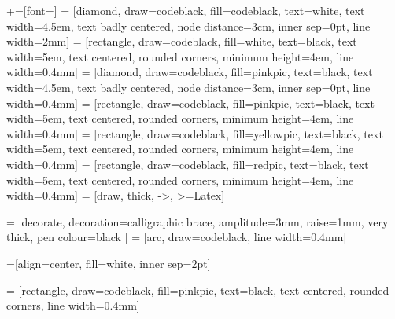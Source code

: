 +=[font=\footnotesize\sffamily]
\usetikzlibrary{calc, shapes, arrows, decorations.pathreplacing, calligraphy,
                positioning, arrows.meta}
 = [diamond, draw=codeblack, fill=codeblack, text=white,
    text width=4.5em, text badly centered, node distance=3cm, inner sep=0pt,
    line width=2mm]
 = [rectangle, draw=codeblack, fill=white,  text=black,
    text width=5em, text centered, rounded corners, minimum height=4em,
    line width=0.4mm]
 = [diamond, draw=codeblack, fill=pinkpic, text=black,
    text width=4.5em, text badly centered, node distance=3cm, inner sep=0pt,
    line width=0.4mm]
 = [rectangle, draw=codeblack, fill=pinkpic,  text=black,
    text width=5em, text centered, rounded corners, minimum height=4em,
    line width=0.4mm]
 = [rectangle, draw=codeblack, fill=yellowpic,  text=black,
    text width=5em, text centered, rounded corners, minimum height=4em,
    line width=0.4mm]
 = [rectangle, draw=codeblack, fill=redpic,  text=black,
    text width=5em, text centered, rounded corners, minimum height=4em,
    line width=0.4mm]
 = [draw, thick, ->, >={Latex}]

 =  [decorate,  %
                 decoration={calligraphic brace, amplitude=3mm, raise=1mm},
                 very thick, pen colour={black} ]
 = [arc, draw=codeblack, line width=0.4mm]

=[align=center, fill=white, inner sep=2pt]

 = [rectangle, draw=codeblack, fill=pinkpic,  text=black,
    text centered, rounded corners, line width=0.4mm]
\pgfplotsset{compat=1.18}
\pgfplotsset{width=\textwidth}
